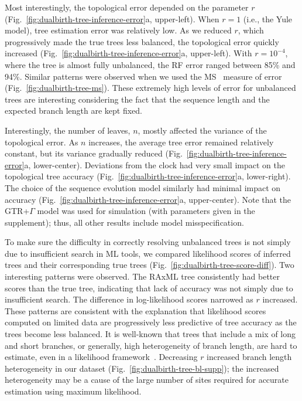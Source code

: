 Most interestingly, the topological error depended on the parameter $r$ (Fig.~\ref{fig:dualbirth-tree-inference-error}a, upper-left). When $r=1$ (i.e., the Yule model), tree estimation error was relatively low. As we reduced $r$, which progressively made the true trees less balanced, the topological error quickly increased (Fig.~\ref{fig:dualbirth-tree-inference-error}a, upper-left). With $r=10^{-4}$, where the tree is almost fully unbalanced, the \gls{RF} error ranged between 85\% and 94\%. Similar patterns were observed when we used the \gls{MS}~\cite{Bogdanowicz2012} measure of error (Fig.~\ref{fig:dualbirth-tree-ms}). These extremely high levels of error for unbalanced trees are interesting considering the fact that the sequence length and the expected branch length are kept fixed.

Interestingly, the number of leaves, $n$, mostly affected the variance of the topological error. As $n$ increases, the average tree error remained relatively constant, but its variance gradually reduced (Fig.~\ref{fig:dualbirth-tree-inference-error}a, lower-center). Deviations from the clock had very small impact on the topological tree accuracy (Fig.~\ref{fig:dualbirth-tree-inference-error}a, lower-right). The choice of the sequence evolution model similarly had minimal impact on accuracy (Fig.~\ref{fig:dualbirth-tree-inference-error}a, upper-center). Note that the \gls{GTR}+$\Gamma$ model was used for simulation (with parameters given in the supplement); thus, all other results include model misspecification.

To make sure the difficulty in correctly resolving unbalanced trees is not simply due to insufficient search in ML tools, we compared likelihood scores of inferred trees and their corresponding true trees (Fig.~\ref{fig:dualbirth-tree-score-diff}). Two interesting patterns were observed. The RAxML tree consistently had better scores than the true tree, indicating that lack of accuracy was not simply due to insufficient search. The difference in log-likelihood scores narrowed as $r$ increased. These patterns are consistent with the explanation that likelihood scores computed on limited data are progressively less predictive of tree accuracy as the trees become less balanced. It is well-known that trees that include a mix of long and short branches, or generally, high heterogeneity of branch length, are hard to estimate, even in a likelihood framework~\cite{Kuhner1994,Kolaczkowski2004}. Decreasing $r$ increased branch length heterogeneity in our dataset (Fig.~\ref{fig:dualbirth-tree-bl-supp}); the increased heterogeneity may be a cause of the large number of sites required for accurate estimation using maximum likelihood. 

